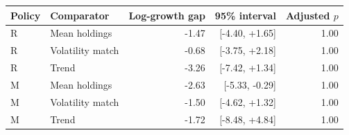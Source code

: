 \begin{tabular}{@{}llrrr@{}}\toprule
Policy & Comparator & Log-growth gap & 95\% interval & Adjusted $p$\\\midrule
R & Mean holdings & -1.47 & [-4.40, +1.65] & 1.00\\
R & Volatility match & -0.68 & [-3.75, +2.18] & 1.00\\
R & Trend & -3.26 & [-7.42, +1.34] & 1.00\\
M & Mean holdings & -2.63 & [-5.33, -0.29] & 1.00\\
M & Volatility match & -1.50 & [-4.62, +1.32] & 1.00\\
M & Trend & -1.72 & [-8.48, +4.84] & 1.00\\
\bottomrule
\end{tabular}
